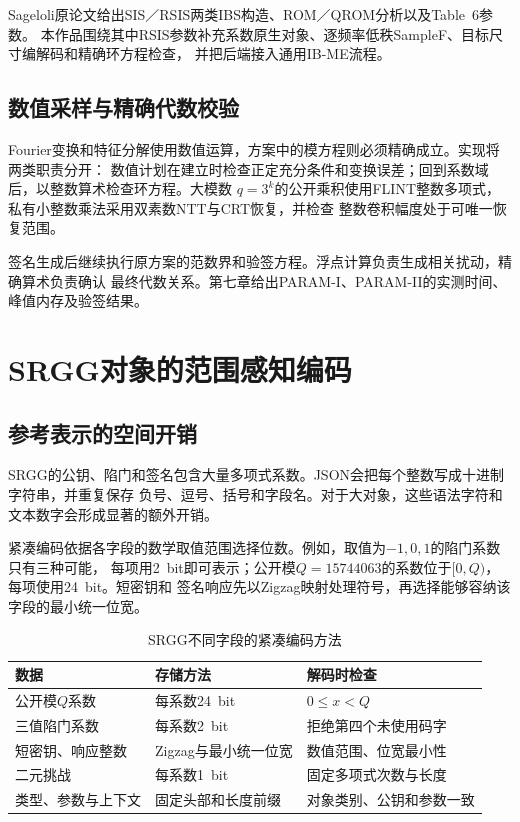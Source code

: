 \begin{mathchapterlayout}
Sageloli原论文给出SIS／RSIS两类IBS构造、ROM／QROM分析以及Table~6参数\cite{sageloli2023ibs}。
本作品围绕其中RSIS参数补充系数原生对象、逐频率低秩SampleF、目标尺寸编解码和精确环方程检查，
并把后端接入通用IB-ME流程。

\subsection{数值采样与精确代数校验}

Fourier变换和特征分解使用数值运算，方案中的模方程则必须精确成立。实现将两类职责分开：
数值计划在建立时检查正定充分条件和变换误差；回到系数域后，以整数算术检查环方程。大模数
$q=3^k$的公开乘积使用FLINT整数多项式，私有小整数乘法采用双素数NTT与CRT恢复，并检查
整数卷积幅度处于可唯一恢复范围。

签名生成后继续执行原方案的范数界和验签方程。浮点计算负责生成相关扰动，精确算术负责确认
最终代数关系。第七章给出PARAM-I、PARAM-II的实测时间、峰值内存及验签结果。

\section{SRGG对象的范围感知编码}
\label{sec:srgg-codec}

\subsection{参考表示的空间开销}

SRGG的公钥、陷门和签名包含大量多项式系数。JSON会把每个整数写成十进制字符串，并重复保存
负号、逗号、括号和字段名。对于大对象，这些语法字符和文本数字会形成显著的额外开销。

紧凑编码依据各字段的数学取值范围选择位数。例如，取值为$-1,0,1$的陷门系数只有三种可能，
每项用2~bit即可表示；公开模$Q=15744063$的系数位于$[0,Q)$，每项使用24~bit。短密钥和
签名响应先以Zigzag映射处理符号，再选择能够容纳该字段的最小统一位宽。

\begin{table}[H]
\centering\small
\caption{SRGG不同字段的紧凑编码方法}
\label{tab:codec-fields}
\begin{tabularx}{\textwidth}{@{}p{}p{}X@{}}
\toprule
\rowcolor{black!8} 数据 & 存储方法 & 解码时检查 \\
\midrule
公开模$Q$系数 & 每系数24~bit & $0\leq x<Q$ \\
三值陷门系数 & 每系数2~bit & 拒绝第四个未使用码字 \\
短密钥、响应整数 & Zigzag与最小统一位宽 & 数值范围、位宽最小性 \\
二元挑战 & 每系数1~bit & 固定多项式次数与长度 \\
类型、参数与上下文 & 固定头部和长度前缀 & 对象类别、公钥和参数一致 \\
\bottomrule
\end{tabularx}
\end{table}


\end{mathchapterlayout}
